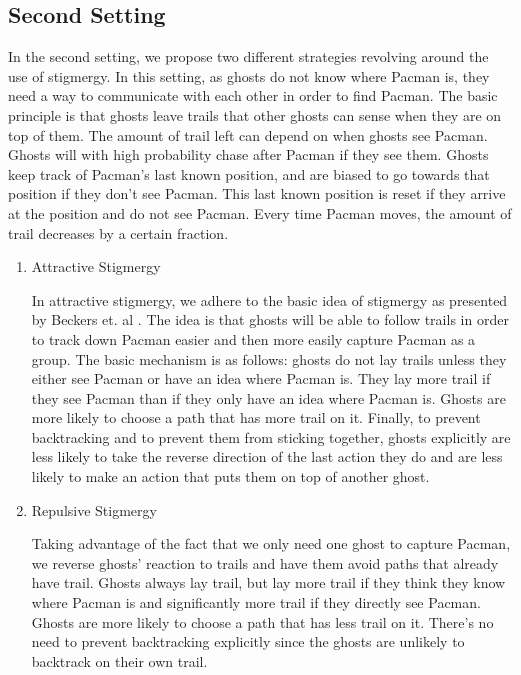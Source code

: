 \documentclass[11pt]{article}
\begin{document}
\begin{multicols}{2}
\subsection{Second Setting}
In the second setting, we propose two different strategies revolving around the use of stigmergy.  In this setting, as ghosts do not know where Pacman is, they need a way to communicate with each other in order to find Pacman. The basic principle is that ghosts leave trails that other ghosts can sense when they are on top of them. The amount of trail left can depend on when ghosts see Pacman.  Ghosts will with high probability chase after Pacman if they see them.  Ghosts keep track of Pacman's last known position, and are biased to go towards that position if they don't see Pacman.  This last known position is reset if they arrive at the position and do not see Pacman.  Every time Pacman moves, the amount of trail decreases by a certain fraction.

\begin{enumerate}[leftmargin=0.25cm]
	\item Attractive Stigmergy
	
 	In attractive stigmergy, we adhere to the basic idea of stigmergy as presented by Beckers et. al \cite{beckers1992trails}. The idea is that ghosts will be able to follow trails in order to track down Pacman easier and then more easily capture Pacman as a group.  The basic mechanism is as follows: ghosts do not lay trails unless they either see Pacman or have an idea where Pacman is.  They lay more trail if they see Pacman than if they only have an idea where Pacman is.  Ghosts are more likely to choose a path that has more trail on it.  Finally, to prevent backtracking and to prevent them from sticking together, ghosts explicitly are less likely to take the reverse direction of the last action they do and are less likely to make an action that puts them on top of another ghost.
	
	\item Repulsive Stigmergy
	
	Taking advantage of the fact that we only need one ghost to capture Pacman, we reverse ghosts' reaction to trails and have them avoid paths that already have trail.  Ghosts always lay trail, but lay more trail if they think they know where Pacman is and significantly more trail if they directly see Pacman. Ghosts are more likely to choose a path that has less trail on it.  There's no need to prevent backtracking explicitly since the ghosts are unlikely to backtrack on their own trail.
\end{enumerate}



\end{multicols}
\end{document}
